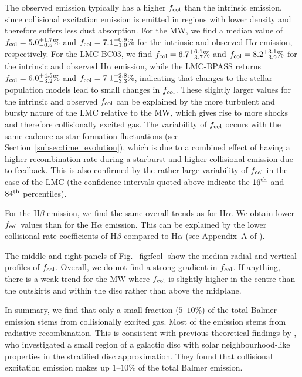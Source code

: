 \documentclass[fleqn,usenatbib]{mnras}
\begin{document}
The observed emission typically has a higher $f_{\rm col}$ than the intrinsic emission, since collisional excitation emission is emitted in regions with lower density and therefore suffers less dust absorption. For the MW, we find a median value of $f_{\rm col}=5.0_{-0.8}^{+1.7}\%$ and $f_{\rm col}=7.1_{-1.0}^{+0.9}\%$ for the intrinsic and observed H$\alpha$ emission, respectively. For the LMC-BC03, we find $f_{\rm col}=6.7_{-3.7}^{+6.1}\%$ and $f_{\rm col}=8.2_{-3.9}^{+3.1}\%$ for the intrinsic and observed H$\alpha$ emission, while the LMC-BPASS returns $f_{\rm col}=6.0_{-3.2}^{+4.5}\%$ and $f_{\rm col}=7.1_{-3.3}^{+2.8}\%$, indicating that changes to the stellar population models lead to small changes in $f_{\rm col}$. These slightly larger values for the intrinsic and observed $f_{\rm col}$ can be explained by the more turbulent and bursty nature of the LMC relative to the MW, which gives rise to more shocks and therefore collisionally excited gas. The variability of $f_{\rm col}$ occurs with the same cadence as star formation fluctuations (see Section~\ref{subsec:time_evolution}), which is due to a combined effect of having a higher recombination rate during a starburst and higher collisional emission due to feedback. This is also confirmed by the rather large variability of $f_{\rm col}$ in the case of the LMC (the confidence intervals quoted above indicate the $16^{\rm th}$ and $84^{\rm th}$ percentiles).

For the H$\beta$ emission, we find the same overall trends as for H$\alpha$. We obtain lower $f_{\rm col}$ values than for the H$\alpha$ emission. This can be explained by the lower collisional rate coefficients of H$\beta$ compared to H$\alpha$ (see Appendix~A of \citealt{smith21_rt}).

The middle and right panels of Fig.~\ref{fig:fcol} show the median radial and vertical profiles of $f_{\rm col}$. Overall, we do not find a strong gradient in $f_{\rm col}$. If anything, there is a weak trend for the MW where $f_{\rm col}$ is slightly higher in the centre than the outskirts and within the disc rather than above the midplane.

In summary, we find that only a small fraction ($5$--$10\%$) of the total Balmer emission stems from collisionally excited gas. Most of the emission stems from radiative recombination. This is consistent with previous theoretical findings by \citet{peters17}, who investigated a small region of a galactic disc with solar neighbourhood-like properties in the stratified disc approximation. They found that collisional excitation emission makes up $1$--$10\%$ of the total Balmer emission.
\end{document}
